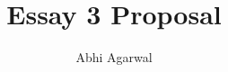 \documentclass[11pt, oneside]{article}
\title{Essay 3 Proposal}
\author{Abhi Agarwal}
\date{}
\begin{document}
\maketitle

\par 
\end{document}
